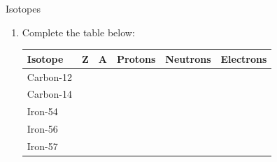 \begin{exercises}  {Isotopes }
\begin{enumerate}[noitemsep, label=\textbf{\arabic*}. ]
\label{m38753*id258452}\begin{enumerate}[noitemsep, label=\textbf{\alph*}. ] 
            \label{m38753*uid65}\item $_{92}^{238}\text{E}$
\label{m38753*uid66}\item $_{90}^{238}\text{E}$
\label{m38753*uid67}\item $_{92}^{235}\text{E}$
\end{enumerate}
            \label{m38753*uid619}\item Complete the table below:
          \begin{center}
\begin{tabular}{|p{2cm}|p{1cm}|p{1cm}|p{1.4cm}|p{1.4cm}|p{1.4cm}|}\hline
\textbf{Isotope} & \textbf{Z} & \textbf{A} & \textbf{Protons} & \textbf{Neutrons} & \textbf{Electrons}\\\hline
Carbon-12 & & & & & \\\hline
Carbon-14 & & & & & \\\hline
Iron-54 & & & & & \\\hline
Iron-56 & & & & & \\\hline
Iron-57 & & & & & \\ \hline
\end{tabular}
\end{center}


\end{enumerate}
\end{exercises}
